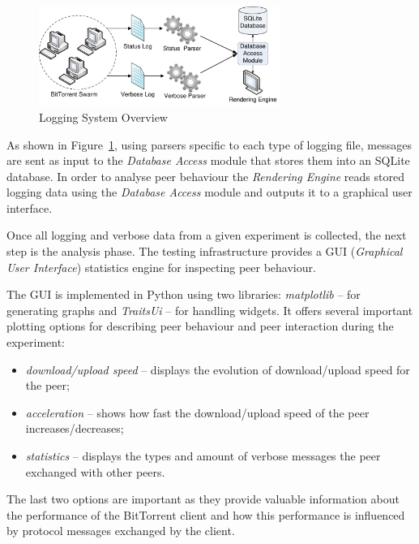 \begin{figure}[h]
  \begin{center}
    \includegraphics[width=0.7\textwidth]{src/img/proto-measure/logarch-not-use}
  \end{center}
  \caption{Logging System Overview}
  \label{fig:proto-measure:logarch}
\end{figure}

As shown in Figure~\ref{fig:proto-measure:logarch}, using parsers specific to
each type of logging file, messages are sent as input to the \textit{Database
Access} module that stores them into an SQLite database. In order to analyse
peer behaviour the \textit{Rendering Engine} reads stored logging data using
the \textit{Database Access} module and outputs it to a graphical user
interface.

Once all logging and verbose data from a given experiment is collected, the
next step is the analysis phase. The testing infrastructure provides a GUI
(\textit{Graphical User Interface}) statistics engine for inspecting peer
behaviour.

The GUI is implemented in Python using two libraries: \textit{matplotlib}
-- for generating graphs and \textit{TraitsUi} -- for handling widgets. It
offers several important plotting options for describing peer behaviour and
peer interaction during the experiment:

\begin{itemize}
  \item \textit{download/upload speed} -- displays the evolution of
download/upload speed for the peer;
  \item \textit{acceleration} -- shows how fast the download/upload speed of
the peer increases/decreases;
  \item \textit{statistics} -- displays the types and amount of verbose
messages the peer exchanged with other peers.
\end{itemize}

The last two options are important as they provide valuable information about
the performance of the BitTorrent client and how this performance is
influenced by protocol messages exchanged by the client.

